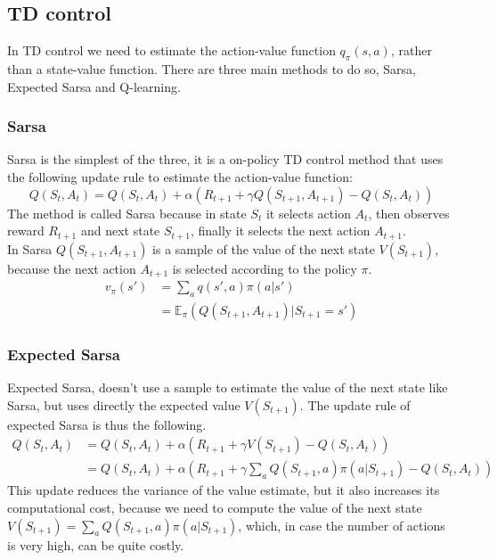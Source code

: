 \subsection{TD control}
In TD control we need to estimate the action-value function $q_{\pi}(s, a)$, rather than a state-value function. There are three main methods to do so, Sarsa, Expected Sarsa and Q-learning.

\subsubsection{Sarsa}
Sarsa is the simplest of the three, it is a on-policy TD control method that uses the following update rule to estimate the action-value function:
\begin{equation}
    Q(S_t, A_t) = Q(S_t, A_t) + \alpha (R_{t+1} + \gamma Q(S_{t+1}, A_{t+1}) - Q(S_t, A_t))
    \label{Sarsa-update}
\end{equation}
The method is called Sarsa because in state $S_t$ it selects action $A_t$, then observes reward $R_{t+1}$ and next state $S_{t+1}$, finally it selects the next action $A_{t+1}$.\\
In Sarsa $Q(S_{t+1}, A_{t+1})$ is a sample of the value of the next state $V(S_{t+1})$, because the next action $A_{t+1}$ is selected according to the policy $\pi$.
\begin{equation*}
    \begin{split}
        v_{\pi}(s') & = \sum_a{q(s', a) \pi(a | s')} \\
        & = \mathds{E}_{\pi}(Q(S_{t+1}, A_{t+1}) | S_{t+1} = s')
    \end{split}
\end{equation*}

\subsubsection{Expected Sarsa}
Expected Sarsa, doesn't use a sample to estimate the value of the next state like Sarsa, but uses directly the expected value $V(S_{t+1})$. The update rule of expected Sarsa is thus the following.
\begin{equation}
    \begin{split}
        Q(S_t, A_t) & = Q(S_t, A_t) + \alpha (R_{t+1} + \gamma V(S_{t+1}) - Q(S_t, A_t)) \\
        & = Q(S_t, A_t) + \alpha (R_{t+1} + \gamma \sum_a{Q(S_{t+1}, a) \pi(a | S_{t+1})} - Q(S_t, A_t))
    \end{split}
    \label{expected-Sarsa-update}
\end{equation}
This update reduces the variance of the value estimate, but it also increases its computational cost, because we need to compute the value of the next state $V(S_{t+1}) = \sum_a{Q(S_{t+1}, a) \pi(a | S_{t+1})}$, which, in case the number of actions is very high, can be quite costly.

